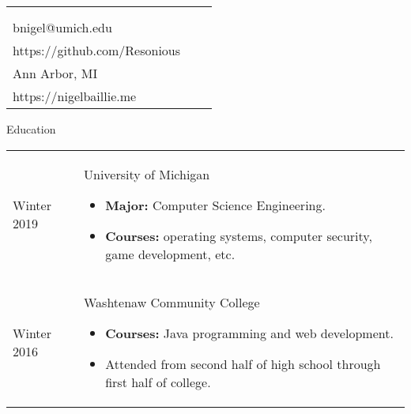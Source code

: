 \documentclass[11pt]{article}
\makeatletter
\def \address{Ann Arbor, MI}
\def \author{Nigel Baillie}
\def \email{bnigel@umich.edu}
\def \phonenumber{(734) 678-5328}
\def \bday{Born April $11^{\text{th}}$ 1995}
\def \github{https://github.com/Resonious}
\def \homepage{https://nigelbaillie.me}
\renewcommand{\section}[1]{{\Huge{#1}}\vspace{2 mm}}
\newenvironment{timeline}
        {\begin{tabular}{p{21 mm}|p{150 mm}}}
        {\end{tabular}}
\newenvironment{timelinetitle}
        {\vspace{-2 mm}\begin{large}}
        {\end{large}\vspace{-1.5 mm}}
\newcommand{\timespan}[2]{{#2}\newline{#1}}
\makeatother
\begin{document}
\newlength{\rcollength}\setlength{\rcollength}{3.0in}%
\begin{tabular} {
  p{}
  p{}
  p{}
}
  \begin{flushleft}
    {\Huge{\author}}\\
    \vspace{1.5 mm}
  \end{flushleft}
  &
  \begin{center}
    {\phonenumber}\\
    {\email}\\
    {\github}
  \end{center}
  &
  \begin{flushright}
    {\bday}\\
    {\address}\\
    {\homepage}
  \end{flushright}
\end{tabular}

\section{Education}

\begin{timeline}
\timespan{Fall 2016}{Winter 2019}
&
\begin{timelinetitle}
    University of Michigan
\end{timelinetitle}
\begin{itemize}
  \item \textbf{Major:} Computer Science Engineering.
  \item \textbf{Courses:} operating systems, computer security, game development, etc.
\end{itemize}

\\

\timespan{Fall 2012}{Winter 2016}
&
\begin{timelinetitle}
    Washtenaw Community College
\end{timelinetitle}
\begin{itemize}
  \item \textbf{Courses:} Java programming and web development.
  \item Attended from second half of high school through first half of college.
\end{itemize}

\end{timeline}
\end{document}
